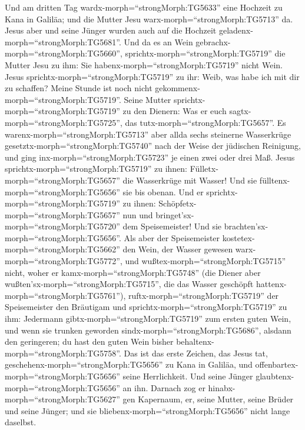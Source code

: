 Und am dritten Tag wardx-morph=``strongMorph:TG5633'' eine
Hochzeit zu Kana in Galiläa; und die Mutter Jesu
warx-morph=``strongMorph:TG5713'' da.  Jesus aber und seine
Jünger wurden auch auf die Hochzeit
geladenx-morph=``strongMorph:TG5681''.  Und da es an Wein
gebrachx-morph=``strongMorph:TG5660'',
sprichtx-morph=``strongMorph:TG5719'' die Mutter Jesu zu ihm: Sie
habenx-morph=``strongMorph:TG5719'' nicht Wein.  Jesus
sprichtx-morph=``strongMorph:TG5719'' zu ihr: Weib, was habe ich mit dir
zu schaffen? Meine Stunde ist noch nicht
gekommenx-morph=``strongMorph:TG5719''.  Seine Mutter
sprichtx-morph=``strongMorph:TG5719'' zu den Dienern: Was er euch
sagtx-morph=``strongMorph:TG5725'', das
tutx-morph=``strongMorph:TG5657''.  Es
warenx-morph=``strongMorph:TG5713'' aber allda sechs steinerne
Wasserkrüge gesetztx-morph=``strongMorph:TG5740'' nach der Weise der
jüdischen Reinigung, und ging inx-morph=``strongMorph:TG5723'' je einen
zwei oder drei Maß.  Jesus
sprichtx-morph=``strongMorph:TG5719'' zu ihnen:
Fülletx-morph=``strongMorph:TG5657'' die Wasserkrüge mit Wasser! Und sie
fülltenx-morph=``strongMorph:TG5656'' sie bis obenan.  Und
er sprichtx-morph=``strongMorph:TG5719'' zu ihnen:
Schöpfetx-morph=``strongMorph:TG5657'' nun und
bringet'sx-morph=``strongMorph:TG5720'' dem Speisemeister! Und sie
brachten'sx-morph=``strongMorph:TG5656''.  Als aber der
Speisemeister kostetex-morph=``strongMorph:TG5662'' den Wein, der Wasser
gewesen warx-morph=``strongMorph:TG5772'', und
wußtex-morph=``strongMorph:TG5715'' nicht, woher er
kamx-morph=``strongMorph:TG5748'' (die Diener aber
wußten'sx-morph=``strongMorph:TG5715'', die das Wasser geschöpft
hattenx-morph=``strongMorph:TG5761''),
ruftx-morph=``strongMorph:TG5719'' der Speisemeister den Bräutigam
 und sprichtx-morph=``strongMorph:TG5719'' zu ihm:
Jedermann gibtx-morph=``strongMorph:TG5719'' zum ersten guten Wein, und
wenn sie trunken geworden sindx-morph=``strongMorph:TG5686'', alsdann
den geringeren; du hast den guten Wein bisher
behaltenx-morph=``strongMorph:TG5758''.  Das ist das erste
Zeichen, das Jesus tat, geschehenx-morph=``strongMorph:TG5656'' zu Kana
in Galiläa, und offenbartex-morph=``strongMorph:TG5656'' seine
Herrlichkeit. Und seine Jünger glaubtenx-morph=``strongMorph:TG5656'' an
ihn.  Darnach zog er hinabx-morph=``strongMorph:TG5627''
gen Kapernaum, er, seine Mutter, seine Brüder und seine Jünger; und sie
bliebenx-morph=``strongMorph:TG5656'' nicht lange daselbst.
